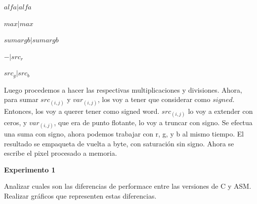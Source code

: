 $alfa | alfa$

$max | max$

$sumargb | sumargb$

$- | src_r$

$src_g | src_b$

Luego procedemos a hacer las respectivas multiplicaciones y divisiones. Ahora, para sumar $src_{(i,j)}$ y $var_{(i,j)}$, los voy a tener que
considerar como $signed$. Entonces, los voy a querer tener como signed word. $src_{(i,j)}$ lo voy a extender con ceros, y $var_{(i,j)}$, que era
de punto flotante, lo voy a truncar con signo. Se efectua una suma con signo, ahora podemos trabajar con r, g, y b al mismo tiempo. El resultado
se empaqueta de vuelta a byte, con saturación sin signo. Ahora se escribe el pixel procesado a memoria.

\vspace*{0.3cm} \noindent
\textbf{Experimento 1}

  Analizar cuales son las diferencias de performace entre las versiones de C y ASM. 
  Realizar gráficos que representen estas diferencias.

